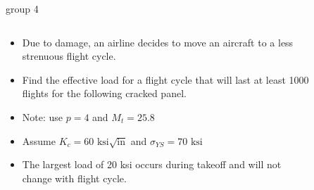 \documentclass[10pt]{beamer}
\begin{document}
	\begin{frame}{group 4}
		
			\begin{columns}
				\begin{column}{0.48\linewidth}
					\begin{itemize}
						\item Due to damage, an airline decides to move an aircraft to a less strenuous flight cycle. 
						\item Find the effective load for a flight cycle that will last at least 1000 flights for the following cracked panel.
						\item Note: use $p=4$ and $M_t = 25.8$
						\item Assume $K_c = 60 \text{ ksi}\sqrt{\text{in}}$ and $\sigma_{YS} = 70 \text{ ksi}$
						\item The largest load of 20 ksi occurs during takeoff and will not change with flight cycle.
					\end{itemize}
				\end{column}
				
				\begin{column}{0.48\linewidth}
					\begin{figure}[H]
						\centering
					\end{figure}
				\end{column}
			\end{columns}
	\end{frame}
	
\end{document}
